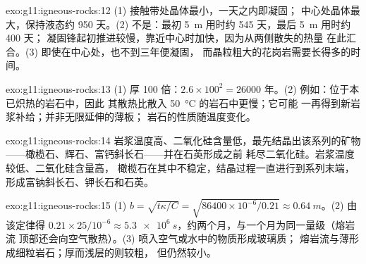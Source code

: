 \begin{solution}{exo:g11:igneous-rocks:12}
(1) 接触带处晶体最小，一天之内即凝固；
中心处晶体最大，保持液态约 950 天。(2) 不是：最初
\qty{5}{m} 用时约 545 天，最后 \qty{5}{m} 用时约 400 天；
凝固锋起初推进较慢，靠近中心时加快，因为从两侧散失的热量
在此汇合。(3) 即使在中心处，也不到三年便凝固，
而晶粒粗大的花岗岩需要长得多的时间。
\end{solution}

\begin{solution}{exo:g11:igneous-rocks:13}
(1) 厚 100 倍：$2.6 \times 100^2 = \num{26000}$
年。(2) 例如：位于本已炽热的岩石中，因此
其散热比散入 \qty{50}{\degreeCelsius} 的岩石中更慢；它可能
一再得到新岩浆补给；并非无限延伸的薄板；
岩石的性质随温度变化。
\end{solution}

\begin{solution}{exo:g11:igneous-rocks:14}
岩浆温度高、二氧化硅含量低，最先结晶出该系列的矿物
——橄榄石、辉石、富钙斜长石——并在石英形成之前
耗尽二氧化硅。岩浆温度较低、二氧化硅含量高，
橄榄石在其中不稳定，结晶过程一直进行到系列末端，
形成富钠斜长石、钾长石和石英。
\end{solution}

\begin{solution}{exo:g11:igneous-rocks:15}
(1) $b = \sqrt{t\kappa/C} = \sqrt{86400 \times 10^{-6}/0.21} \approx
\qty{0.64}{m}$。(2) 由该定律得 $0.21 \times 25/10^{-6} \approx
\qty{5.3e6}{s}$，约两个月，与一个月为同一量级（熔岩流
顶部还会向空气散热）。(3) 喷入空气或水中的物质形成玻璃质；
熔岩流与薄形成细粒岩石；厚而浅层的则较粗，
但仍然较小。
\end{solution}

